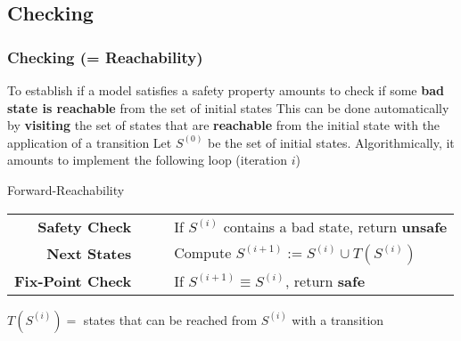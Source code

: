 \subsection{Checking}

\begin{frame}
  \frametitle{Checking (= Reachability)}

  To establish if a model satisfies a safety 
  property amounts to check if some
  {\bf bad state is reachable} from the set
  of initial states
  \vfill
  This can be done automatically by {\bf visiting} the
  set of states that are {\bf reachable} from the initial
  state with the application of a transition
  \vfill
  \pause
  Let $S^{(0)}$ be the set of initial states.
  Algorithmically, it amounts to implement the following loop
  (iteration $i$)
  \vfill
  \begin{boxedminipage}{\textwidth}
  \begin{center}
  Forward-Reachability
  \begin{tabular}{rcl}
     \\
       {\bf Safety Check} & ~~ & If $S^{(i)}$ contains a bad state, return {\bf unsafe} \\
        {\bf Next States} & ~~ & Compute $S^{(i+1)} := S^{(i)} \cup T(S^{(i)})$ \\
    {\bf Fix-Point Check} & ~~ & If $S^{(i+1)} \equiv S^{(i)}$, return {\bf safe} 
  \end{tabular}
  \end{center}
  \end{boxedminipage}
  \vfill
  $T(S^{(i)}) = $ states that can be reached from $S^{(i)}$ with a transition

\end{frame}

